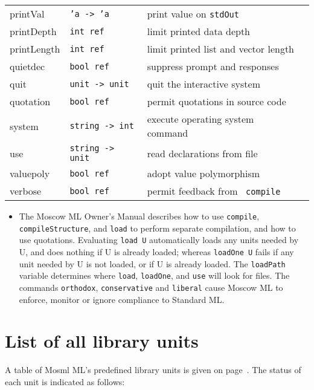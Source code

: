 \documentclass[fleqn]{article}
\begin{document}
\begin{tabular}{@{\tt\ \ }llll}
printVal       & {\tt 'a -> 'a}  & print value on \verb#stdOut#\\
printDepth     & {\tt int ref}   & limit printed data depth\\
printLength    & {\tt int ref}   & limit printed list and vector length\\
quietdec       & {\tt bool ref}  & suppress prompt and responses\\
quit           & {\tt unit -> unit} & quit the interactive system\\
quotation      & {\tt bool ref}   & permit quotations in source code\\
system         & {\tt string -> int} & execute operating system command\\
use            & {\tt string -> unit} & read declarations from file\\
valuepoly      & {\tt bool ref}   & adopt value polymorphism \\
verbose        & {\tt bool ref}   & permit feedback from {\tt
  compile}\\\hline
\end{tabular}

\begin{itemize}
\item The Moscow ML Owner's Manual describes how to use {\tt compile},
  {\tt compileStructure}, 
  and {\tt load} to perform separate compilation, and how to use
  quotations.  Evaluating {\tt load {\rm U}} automatically loads any
  units needed by U, and does nothing if U is already loaded; whereas
  {\tt loadOne {\rm U}} fails if any unit needed by U is not loaded,
  or if U is already loaded.  The {\tt loadPath} variable determines
  where {\tt load}, {\tt loadOne}, and {\tt use} will look for files.
  The commands {\tt orthodox}, {\tt conservative} and {\tt liberal}
  cause Moscow ML to enforce, monitor or ignore compliance to Standard ML.
\end{itemize}

\newpage
\section{List of all library units}

A table of Mosml ML's predefined library units is given on
page~\pageref{table-predefined-units}.  The status of each unit is
indicated as follows:
\end{document}
